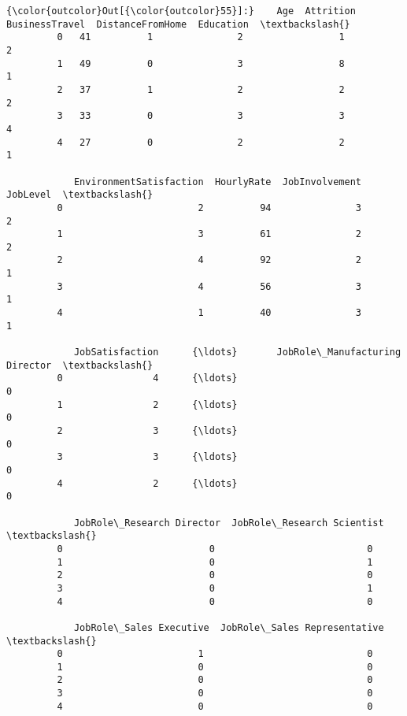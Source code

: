 \documentclass[11pt]{article}
\begin{document}
\begin{Verbatim}[commandchars=\\\{\}]
{\color{outcolor}Out[{\color{outcolor}55}]:}    Age  Attrition  BusinessTravel  DistanceFromHome  Education  \textbackslash{}
         0   41          1               2                 1          2   
         1   49          0               3                 8          1   
         2   37          1               2                 2          2   
         3   33          0               3                 3          4   
         4   27          0               2                 2          1   
         
            EnvironmentSatisfaction  HourlyRate  JobInvolvement  JobLevel  \textbackslash{}
         0                        2          94               3         2   
         1                        3          61               2         2   
         2                        4          92               2         1   
         3                        4          56               3         1   
         4                        1          40               3         1   
         
            JobSatisfaction      {\ldots}       JobRole\_Manufacturing Director  \textbackslash{}
         0                4      {\ldots}                                    0   
         1                2      {\ldots}                                    0   
         2                3      {\ldots}                                    0   
         3                3      {\ldots}                                    0   
         4                2      {\ldots}                                    0   
         
            JobRole\_Research Director  JobRole\_Research Scientist  \textbackslash{}
         0                          0                           0   
         1                          0                           1   
         2                          0                           0   
         3                          0                           1   
         4                          0                           0   
         
            JobRole\_Sales Executive  JobRole\_Sales Representative  \textbackslash{}
         0                        1                             0   
         1                        0                             0   
         2                        0                             0   
         3                        0                             0   
         4                        0                             0   
         

\end{Verbatim}
\end{document}
